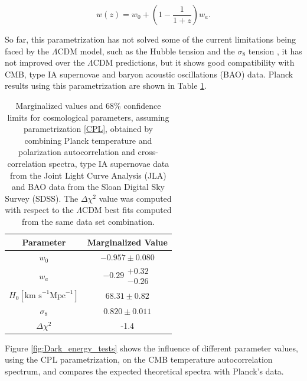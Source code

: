 \documentclass[openany,a4paper,12pt,oneside]{book}
\begin{document}
\begin{spacing}{1.5}
\begin{equation}\label{CPL}
    w(z)=w_0+\left(1-\frac{1}{1+z}\right)w_a.
\end{equation}


So far, this parametrization has not solved some of the current limitations being faced by the $\Lambda$CDM model, such as the Hubble tension \cite{Hubble_tension_review} and the $\sigma_8$ tension \cite{Planck_results}, it has not improved over the $\Lambda$CDM predictions, but it shows good compatibility with CMB, type IA supernovae and baryon acoustic oscillations (BAO) data\cite{Planck_results}. Planck results using this parametrization are shown in Table \ref{tab:planck_CPL}.

\begin{table}[!htb]
    \centering
    \begin{tabular}{cc} \hline
     Parameter & Marginalized Value \\ \hline
     $w_0$ & $-0.957\pm0.080$\\
     $w_a$ & $-0.29\substack{+0.32 \\ -0.26}$\\
     $H_0 [\text{km s}^{-1}\text{Mpc}^{-1}]$ & $68.31\pm0.82$ \\
     $\sigma_8$ & $0.820\pm 0.011$\\ \hline
     $\Delta \chi^2$ & -1.4 \\ \hline
    \end{tabular}
    \caption{Marginalized values and $68\%$ confidence limits for cosmological parameters, assuming parametrization \eqref{CPL}, obtained by combining Planck temperature and polarization autocorrelation and cross-correlation spectra\cite{Planck_spectra}, type IA supernovae data from the Joint Light Curve Analysis (JLA)\cite{JLA} and BAO data from the Sloan Digital Sky Survey (SDSS)\cite{SDSS}. The $\Delta \chi^2$ value was computed with respect to the $\Lambda$CDM best fits computed from the same data set combination.}
    \label{tab:planck_CPL}
\end{table}

Figure \ref{fig:Dark_energy_tests} shows the influence of different parameter values, using the CPL parametrization, on the CMB temperature autocorrelation spectrum, and compares the expected theoretical spectra with Planck's data.


\end{spacing}
\end{document}
